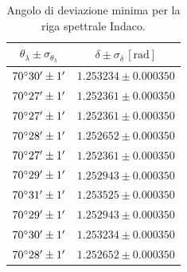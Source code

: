 \documentclass[]{article}
\begin{document}
    \begin{table}[H]
        \centering
        \begin{tabular}{||c|c||}
            \hline
            $\theta_{\lambda} \pm \sigma_{\theta_{\lambda}}$ & $\delta \pm \sigma_{\delta} \,\left[\text{rad}\right]$ \\\hline
            \hline
            $70\degree 30' \pm 1'$ & $1.253234 \pm 0.000350$ \\\hline
            $70\degree 27' \pm 1'$ & $1.252361 \pm 0.000350$ \\\hline
            $70\degree 27' \pm 1'$ & $1.252361 \pm 0.000350$ \\\hline
            $70\degree 28' \pm 1'$ & $1.252652 \pm 0.000350$ \\\hline
            $70\degree 27' \pm 1'$ & $1.252361 \pm 0.000350$ \\\hline
            $70\degree 29' \pm 1'$ & $1.252943 \pm 0.000350$ \\\hline
            $70\degree 31' \pm 1'$ & $1.253525 \pm 0.000350$ \\\hline
            $70\degree 29' \pm 1'$ & $1.252943 \pm 0.000350$ \\\hline
            $70\degree 30' \pm 1'$ & $1.253234 \pm 0.000350$ \\\hline
            $70\degree 28' \pm 1'$ & $1.252652 \pm 0.000350$ \\\hline
        \end{tabular}
        \caption{Angolo di deviazione minima per la riga spettrale Indaco.}
        \label{indaco}
    \end{table}
\end{document}
